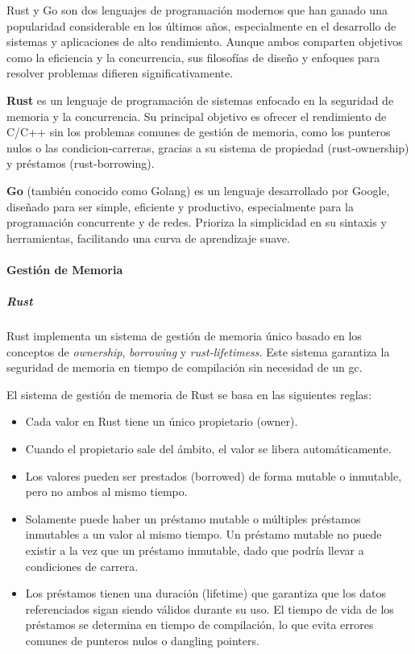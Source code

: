 Rust y Go son dos lenguajes de programación modernos que han ganado una popularidad considerable en los últimos años, especialmente en el desarrollo de sistemas y aplicaciones de alto rendimiento. Aunque ambos comparten objetivos como la eficiencia y la concurrencia, sus filosofías de diseño y enfoques para resolver problemas difieren significativamente.

\textbf{Rust} es un lenguaje de programación de sistemas enfocado en la seguridad de memoria y la concurrencia. Su principal objetivo es ofrecer el rendimiento de C/C++ sin los problemas comunes de gestión de memoria, como los punteros nulos o las \glspl{condicion-carrera}, gracias a su sistema de propiedad (\gls{rust-ownership}) y préstamos (\gls{rust-borrowing}).

\textbf{Go} (también conocido como Golang) es un lenguaje desarrollado por Google, diseñado para ser simple, eficiente y productivo, especialmente para la programación concurrente y de redes. Prioriza la simplicidad en su sintaxis y herramientas, facilitando una curva de aprendizaje suave.

\paragraph{Gestión de Memoria}
\subparagraph{Rust}
Rust implementa un sistema de gestión de memoria único basado en los conceptos de \textit{ownership}, \textit{borrowing} y \textit{\glspl{rust-lifetimes}}. Este sistema garantiza la seguridad de memoria en tiempo de compilación sin necesidad de un \acrfull{gc}.

El sistema de gestión de memoria de Rust se basa en las siguientes reglas:
\begin{itemize}
    \item Cada valor en Rust tiene un único propietario (owner).
    \item Cuando el propietario sale del ámbito, el valor se libera automáticamente.
    \item Los valores pueden ser prestados (borrowed) de forma mutable o inmutable, pero no ambos al mismo tiempo.
    \item Solamente puede haber un préstamo mutable o múltiples préstamos inmutables a un valor al mismo tiempo. Un préstamo mutable no puede existir a la vez que un préstamo inmutable, dado que podría llevar a condiciones de carrera.
    \item Los préstamos tienen una duración (lifetime) que garantiza que los datos referenciados sigan siendo válidos durante su uso. El tiempo de vida de los préstamos se determina en tiempo de compilación, lo que evita errores comunes de punteros nulos o dangling pointers.
\end{itemize}

